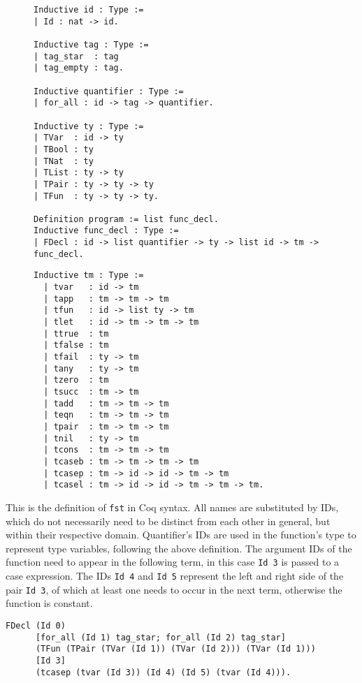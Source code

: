 \documentclass[fleqn]{scrreprt}
\newcommand{\todo}[1]{\marginpar{\textbf{TODO:} #1}}
\newcommand{\coqinline}[1]{\texttt{#1}}
\begin{document}
\begin{figure}[H]
\begin{minipage}[t]{.5 \linewidth}
\begin{verbatim}
Inductive id : Type :=
| Id : nat -> id.

Inductive tag : Type :=
| tag_star  : tag
| tag_empty : tag.

Inductive quantifier : Type :=
| for_all : id -> tag -> quantifier.

Inductive ty : Type :=
| TVar  : id -> ty
| TBool : ty
| TNat  : ty
| TList : ty -> ty
| TPair : ty -> ty -> ty
| TFun  : ty -> ty -> ty.

Definition program := list func_decl.
Inductive func_decl : Type :=
| FDecl : id -> list quantifier -> ty -> list id -> tm -> func_decl.
\end{verbatim}
\end{minipage}
\begin{minipage}[t]{.5 \linewidth}
	\begin{verbatim}
Inductive tm : Type :=
  | tvar   : id -> tm
  | tapp   : tm -> tm -> tm
  | tfun   : id -> list ty -> tm
  | tlet   : id -> tm -> tm -> tm
  | ttrue  : tm
  | tfalse : tm
  | tfail  : ty -> tm
  | tany   : ty -> tm
  | tzero  : tm
  | tsucc  : tm -> tm
  | tadd   : tm -> tm -> tm
  | teqn   : tm -> tm -> tm
  | tpair  : tm -> tm -> tm
  | tnil   : ty -> tm
  | tcons  : tm -> tm -> tm
  | tcaseb : tm -> tm -> tm -> tm
  | tcasep : tm -> id -> id -> tm -> tm
  | tcasel : tm -> id -> id -> tm -> tm -> tm.
	\end{verbatim}
\end{minipage}
\end{figure}
This \todo{label?}is the definition of \texttt{fst} in Coq syntax. All names are substituted by IDs, which do not necessarily need to be distinct from each other in general, but within their respective domain. Quantifier's IDs are used in the function's type to represent type variables, following the above definition. The argument IDs of the function need to appear in the following term, in this case \coqinline{Id 3} is passed to a case expression. The IDs \coqinline{Id 4} and \coqinline{Id 5} represent the left and right side of the pair \coqinline{Id 3}, of which at least one needs to occur in the next term, otherwise the function is constant.
\begin{verbatim}
FDecl (Id 0) 
      [for_all (Id 1) tag_star; for_all (Id 2) tag_star] 
      (TFun (TPair (TVar (Id 1)) (TVar (Id 2))) (TVar (Id 1)))
      [Id 3]
      (tcasep (tvar (Id 3)) (Id 4) (Id 5) (tvar (Id 4))).
\end{verbatim}
\end{document}
